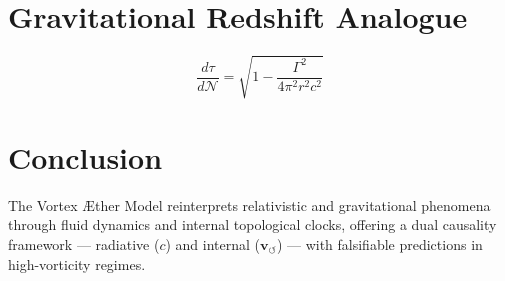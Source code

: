 \documentclass[12pt]{article}
\begin{document}
\section*{Gravitational Redshift Analogue}

\begin{equation}
\boxed{
    \frac{d\tau}{d\mathcal{N}} = \sqrt{1 - \frac{\Gamma^2}{4\pi^2 r^2 c^2}}
}
\label{eq:gravitational-redshift}
\end{equation}

\section*{Conclusion}

The Vortex Æther Model reinterprets relativistic and gravitational phenomena through fluid dynamics and internal topological clocks, offering a dual causality framework — radiative (\( c \)) and internal (\( \mathbf{v}_{\scriptscriptstyle\boldsymbol{\circlearrowleft}} \)) — with falsifiable predictions in high-vorticity regimes.
\end{document}
